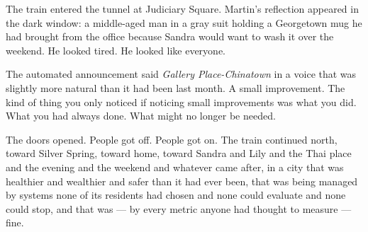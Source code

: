The train entered the tunnel at Judiciary Square. Martin's reflection appeared in the dark window: a middle-aged man in a gray suit holding a Georgetown mug he had brought from the office because Sandra would want to wash it over the weekend. He looked tired. He looked like everyone.

The automated announcement said \emph{Gallery Place-Chinatown} in a voice that was slightly more natural than it had been last month. A small improvement. The kind of thing you only noticed if noticing small improvements was what you did. What you had always done. What might no longer be needed.

The doors opened. People got off. People got on. The train continued north, toward Silver Spring, toward home, toward Sandra and Lily and the Thai place and the evening and the weekend and whatever came after, in a city that was healthier and wealthier and safer than it had ever been, that was being managed by systems none of its residents had chosen and none could evaluate and none could stop, and that was --- by every metric anyone had thought to measure --- fine.

